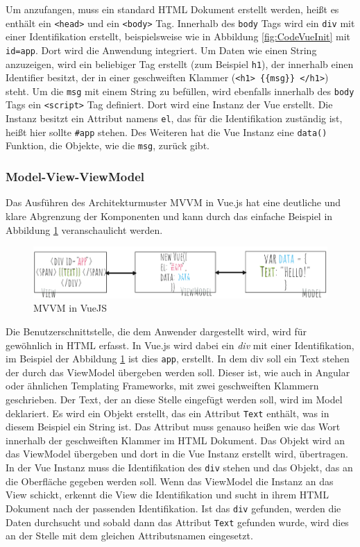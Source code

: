 Um anzufangen, muss ein standard \ac{HTML} Dokument erstellt werden, hei\ss{}t es enth\"alt ein \texttt{<head>} und ein \texttt{<body>} Tag. Innerhalb des \texttt{body} Tags wird ein \texttt{div} mit einer Identifikation erstellt, beispielsweise wie in Abbildung \ref{fig:CodeVueInit} mit \texttt{id=\grqq app\grqq{}}. Dort wird die Anwendung integriert. Um Daten wie einen String anzuzeigen, wird ein beliebiger Tag erstellt (zum Beispiel \texttt{h1}), der innerhalb einen Identifier besitzt, der in einer geschweiften Klammer (\texttt{<h1> \{\{msg\}\} </h1>}) steht. Um die \texttt{msg} mit einem String zu bef\"ullen, wird ebenfalls innerhalb des \texttt{body} Tags ein \texttt{<script>} Tag definiert. Dort wird eine Instanz der Vue erstellt. Die Instanz besitzt ein Attribut namens \texttt{el}, das f\"ur die Identifikation zust\"andig ist, hei\ss{}t hier sollte \texttt{\#app} stehen. Des Weiteren hat die Vue Instanz eine \texttt{data()} Funktion, die Objekte, wie die \texttt{msg}, zur\"uck gibt.

\subsubsection*{Model-View-ViewModel}
Das Ausf\"uhren des Architekturmuster \ac{MVVM} in Vue.js hat eine deutliche und klare Abgrenzung der Komponenten und kann durch das einfache Beispiel in Abbildung \ref{fig:MVVMVue}  veranschaulicht werden.
\begin{figure}[h] 
\centering
\includegraphics[scale=0.6]{fig/vueJSmvvm.PNG} 
\caption{MVVM in VueJS}
\label{fig:MVVMVue}
\end{figure} 
Die Benutzerschnittstelle, die dem Anwender dargestellt wird, wird f\"ur gew\"ohnlich in \ac{HTML} erfasst. In Vue.js wird dabei ein \textit{div} mit einer Identifikation, im Beispiel der Abbildung \ref{fig:MVVMVue} ist dies \texttt{app}, erstellt. In dem div soll ein Text stehen der durch das ViewModel \"ubergeben werden soll. Dieser ist, wie auch in Angular oder \"ahnlichen Templating Frameworks, mit zwei geschweiften Klammern geschrieben. 
Der Text, der an diese Stelle eingef\"ugt werden soll, wird im Model deklariert. Es wird ein Objekt erstellt, das ein Attribut \texttt{Text} enth\"alt, was in diesem Beispiel ein String ist. Das Attribut muss genauso hei\ss{}en wie das Wort innerhalb der geschweiften Klammer im \ac{HTML} Dokument.
Das Objekt wird an das ViewModel \"ubergeben und dort in die Vue Instanz erstellt wird, \"ubertragen. In der Vue Instanz muss die Identifikation des \texttt{div} stehen und das Objekt, das an die Oberfl\"ache gegeben werden soll. Wenn das ViewModel die Instanz an das View schickt, erkennt die View die Identifikation und sucht in ihrem \ac{HTML} Dokument nach der passenden Identifikation. Ist das \texttt{div} gefunden, werden die Daten durchsucht und sobald dann das Attribut \texttt{Text} gefunden wurde, wird dies an der Stelle mit dem gleichen Attributsnamen eingesetzt.
